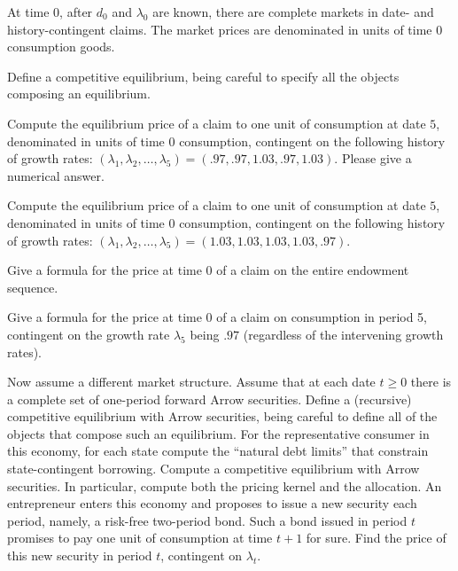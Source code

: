 \medskip
\noindent  At time $0$, after $d_0$ and $\lambda_0$ are known,
there are complete markets in date- and history-contingent claims.
The market prices are denominated in units of time $0$ consumption
goods.

\medskip
{}  Define a competitive equilibrium, being careful
to specify all  the objects composing an equilibrium.

\medskip
{}  Compute the equilibrium price of a claim to one
unit of consumption at date $5$, denominated in units of time $0$
consumption, contingent on the following history of growth rates:
$(\lambda_1, \lambda_2, \ldots, \lambda_5) =( .97, .97, 1.03, .97,
1.03)$.  Please give a numerical answer.

\medskip
{}  Compute the equilibrium price of a claim to one
unit of consumption at date $5$, denominated in units of time $0$
consumption, contingent on the following history of growth rates:
$(\lambda_1, \lambda_2, \ldots, \lambda_5) = (1.03,  1.03, 1.03,
1.03, .97)$.



\medskip
{}  Give a formula for the price at time $0$ of a
claim on the entire endowment sequence.

\medskip
{}  Give a formula for the price at time $0$ of a
claim on consumption in period 5,   contingent on the growth rate
$\lambda_5$ being $.97$ (regardless of the intervening growth
rates).

\vfil\eject

\medskip
{}

\medskip
\noindent Now assume a different market structure.  Assume that at
each date $t\geq 0$ there  is a complete set of one-period forward
Arrow securities.
\medskip
{}  Define a (recursive) competitive equilibrium
with Arrow securities, being careful to define all of the objects
that compose such an equilibrium.
\medskip
{} For the representative consumer in this
economy, for each state compute the ``natural debt limits'' that
constrain state-contingent borrowing.
\medskip
{} Compute a competitive equilibrium with Arrow
securities. In particular,  compute both the pricing kernel and
the allocation.
\medskip
{}  An entrepreneur       enters this economy and
proposes to issue a new security each period,  namely, a risk-free
two-period bond.  Such a bond issued in period $t$ promises to pay
one unit of  consumption at time $t+1$ for sure. Find the price of
this new security in period $t$, contingent on $\lambda_t$.








